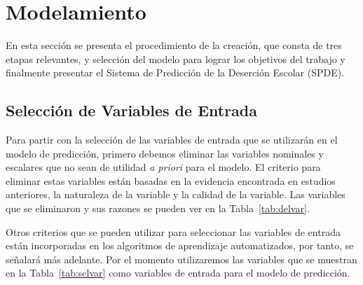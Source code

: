 \section{Modelamiento}
En esta sección se presenta el procedimiento de la creación, que consta de tres etapas relevantes, y selección del modelo para lograr los objetivos del trabajo y finalmente presentar el Sistema de Predicción de la Deserción Escolar (SPDE).

\subsection{Selección de Variables de Entrada}
Para partir con la selección de las variables de entrada que se utilizarán en el modelo de predicción, primero debemos eliminar las variables nominales y escalares que no sean de utilidad \textit{a priori} para el modelo. El criterio para eliminar estas variables están basadas en la evidencia encontrada en estudios anteriores, la naturaleza de la variable y la calidad de la variable. Las variables que se eliminaron y sus razones se pueden ver en la Tabla~\ref{tab:delvar}.

Otros criterios que se pueden utilizar para seleccionar las variables de entrada están incorporadas en los algoritmos de aprendizaje automatizados, por tanto, se señalará más adelante. Por el momento utilizaremos las variables que se muestran en la Tabla~\ref{tab:selvar} como variables de entrada para el modelo de predicción.

